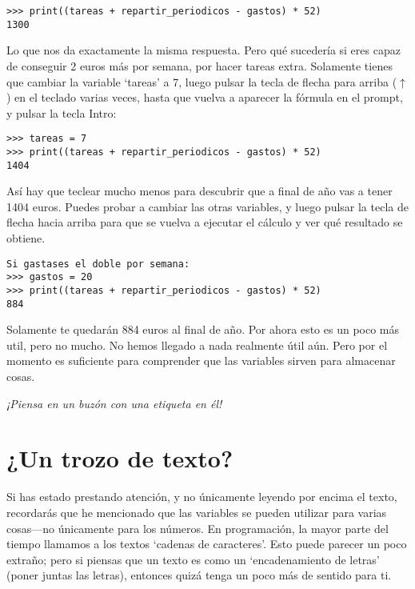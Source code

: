 \begin{listing}
\begin{verbatim}
>>> print((tareas + repartir_periodicos - gastos) * 52)
1300
\end{verbatim}
\end{listing}

Lo que nos da exactamente la misma respuesta. Pero qué sucedería si eres capaz de conseguir 2 euros más por semana, por hacer tareas extra.  Solamente tienes que cambiar la variable `tareas' a 7, luego pulsar la tecla de flecha para arriba ($\uparrow$) en el teclado varias veces, hasta que vuelva a aparecer la fórmula en el prompt, y pulsar la tecla Intro:

\begin{listing}
\begin{verbatim}
>>> tareas = 7
>>> print((tareas + repartir_periodicos - gastos) * 52)
1404
\end{verbatim}
\end{listing}

Así hay que teclear mucho menos para descubrir que a final de año vas a tener 1404 euros. Puedes probar a cambiar las otras variables, y luego pulsar la tecla de flecha hacia arriba para que se vuelva a ejecutar el cálculo y ver qué resultado se obtiene.

\begin{listing}
\begin{verbatim}
Si gastases el doble por semana:
>>> gastos = 20
>>> print((tareas + repartir_periodicos - gastos) * 52)
884
\end{verbatim}
\end{listing}

Solamente te quedarán 884 euros al final de año. Por ahora esto es un poco más util, pero no mucho. No hemos llegado a nada realmente útil aún. Pero por el momento es suficiente para comprender que las variables sirven para almacenar cosas.

\noindent
\emph{¡Piensa en un buzón con una etiqueta en él!}

\section{¿Un trozo de texto?}

Si has estado prestando atención, y no únicamente leyendo por encima el texto, recordarás que he mencionado que las variables se pueden utilizar para varias cosas---no únicamente para los números. En programación, la mayor parte del tiempo llamamos a los textos `cadenas de caracteres'. Esto puede parecer un poco extraño; pero si piensas que un texto es como un `encadenamiento de letras' (poner juntas las letras), entonces quizá tenga un poco más de sentido para ti.

